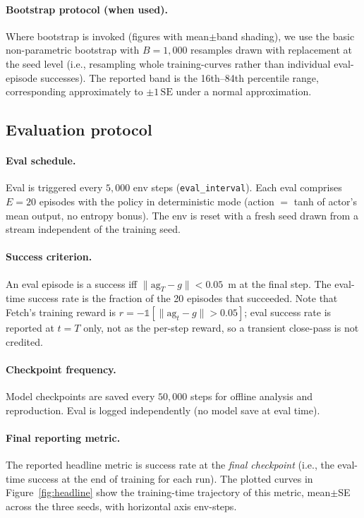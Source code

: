 \paragraph{Bootstrap protocol (when used).}
Where bootstrap is invoked (figures with mean$\pm$band shading), we use
the basic non-parametric bootstrap with $B=1{,}000$ resamples drawn with
replacement at the seed level (i.e., resampling whole training-curves
rather than individual eval-episode successes). The reported band is
the 16th--84th percentile range, corresponding approximately to
$\pm 1\,\mathrm{SE}$ under a normal approximation.

\subsection{Evaluation protocol}
\label{app:eval}

\paragraph{Eval schedule.}
Eval is triggered every $5{,}000$ env steps (\texttt{eval\_interval}).
Each eval comprises $E\!=\!20$ episodes with the policy in deterministic
mode (action $=$ tanh of actor's mean output, no entropy bonus). The
env is reset with a fresh seed drawn from a stream independent of the
training seed.

\paragraph{Success criterion.}
An eval episode is a success iff $\|\text{ag}_T - g\|<0.05$~m at the
final step. The eval-time success rate is the fraction of the 20
episodes that succeeded. Note that Fetch's training reward is
$r=-\mathbb{1}[\|\text{ag}_t-g\|>0.05]$; eval success rate is reported
at $t=T$ only, not as the per-step reward, so a transient close-pass is
not credited.

\paragraph{Checkpoint frequency.}
Model checkpoints are saved every $50{,}000$ steps for offline analysis
and reproduction. Eval is logged independently (no model save at eval
time).

\paragraph{Final reporting metric.}
The reported headline metric is success rate at the \emph{final
checkpoint} (i.e., the eval-time success at the end of training for
each run). The plotted curves in Figure~\ref{fig:headline} show the
training-time trajectory of this metric, mean$\pm$SE across the three
seeds, with horizontal axis env-steps.

